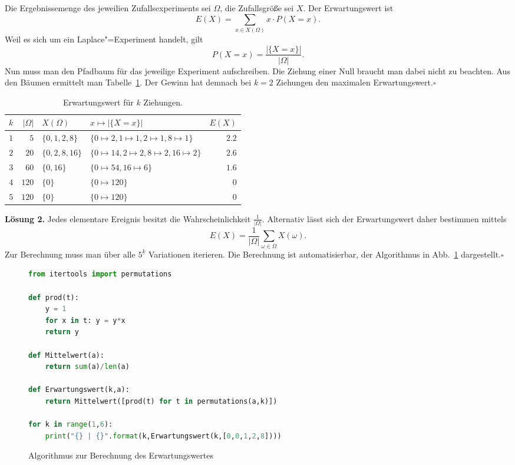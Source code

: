 \documentclass[a4paper,10pt,fleqn,twoside]{scrartcl}
\numberwithin{equation}{section}
\newcommand{\strong}[1]{{\normalfont\sffamily\bfseries #1}}
\renewcommand{\qedsymbol}{\ensuremath{\square}}
\theoremstyle{Aufgabe}
\begin{document}
Die Ergebnissemenge des jeweilien Zufallsexperiments sei $\Omega$,
die Zufallsgröße sei $X$. Der Erwartungswert ist
\[E(X) = \!\!\sum_{x\in X(\Omega)}\!\! x\cdot P(X=x).\]
Weil es sich um ein Laplace"=Experiment handelt, gilt
\[P(X=x) = \frac{|\{X=x\}|}{|\Omega|}.\]
Nun muss man den Pfadbaum für das jeweilige Experiment aufschreiben.
Die Ziehung einer Null braucht man dabei nicht zu beachten.
Aus den Bäumen ermittelt man Tabelle~\ref{tab:Produkt-Gewinn}.
Der Gewinn hat demnach bei $k=2$ Ziehungen den maximalen
Erwartungswert.\;\qedsymbol
\begin{table}
\center
\begin{tabular}{rrllr}
\toprule
$k$ & $|\Omega|$ & $X(\Omega)$ & $x\mapsto |\{X=x\}|$ & $E(X)$\\
\midrule
$1$ & $5$ & $\{0,1,2,8\}$ & $\{0\mapsto 2,1\mapsto 1,2\mapsto 1,8\mapsto 1\}$ & $2.2$\\
$2$ & $20$ & $\{0,2,8,16\}$ & $\{0\mapsto 14,2\mapsto 2,8\mapsto 2,16\mapsto 2\}$ & $2.6$\\
$3$ & $60$ & $\{0,16\}$ & $\{0\mapsto 54,16\mapsto 6\}$ & $1.6$\\
$4$ & $120$ & $\{0\}$ & $\{0\mapsto 120\}$ & $0$ \\
$5$ & $120$ & $\{0\}$ & $\{0\mapsto 120\}$ & $0$\\
\bottomrule
\end{tabular}
\caption{Erwartungswert für $k$ Ziehungen.}
\label{tab:Produkt-Gewinn}
\end{table}

\strong{Lösung 2.} Jedes elementare Ereignis besitzt die
Wahrscheinlichkeit $\tfrac{1}{|\Omega|}$. Alternativ lässt sich der
Erwartungswert daher bestimmen mittels
\[E(X) = \frac{1}{|\Omega|}\sum_{\omega\in\Omega} X(\omega).\]
Zur Berechnung muss man über alle $5^{\underline k}$ Variationen
iterieren. Die Berechnung ist automatisierbar, der Algorithmus in
Abb.~\ref{fig:Erwartungswerte} dargestellt.\;\qedsymbol

\begin{figure}[b!]
\begin{lstlisting}[language=Python]
from itertools import permutations

def prod(t):
    y = 1
    for x in t: y = y*x
    return y

def Mittelwert(a):
    return sum(a)/len(a)

def Erwartungswert(k,a):
    return Mittelwert([prod(t) for t in permutations(a,k)])

for k in range(1,6):
    print("{} | {}".format(k,Erwartungswert(k,[0,0,1,2,8])))
\end{lstlisting}
\caption{Algorithmus zur Berechnung des Erwartungswertes}
\label{fig:Erwartungswerte}
\end{figure}
\end{document}
